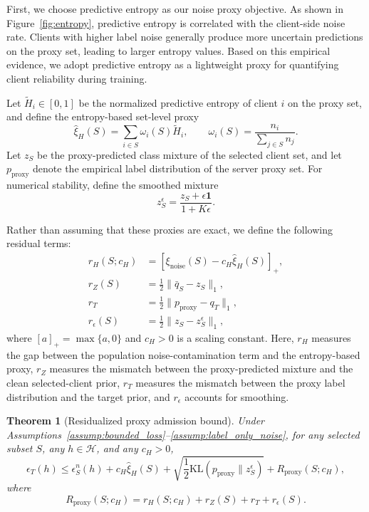 \documentclass[conference]{IEEEtran}
\newtheorem{theorem}{Theorem}
\theoremstyle{definition}
\theoremstyle{remark}
\begin{document}
First, we choose predictive entropy as our noise proxy objective. As shown in Figure~\ref{fig:entropy}, predictive entropy is correlated with the client-side noise rate. Clients with higher label noise generally produce more uncertain predictions on the proxy set, leading to larger entropy values. Based on this empirical evidence, we adopt predictive entropy as a lightweight proxy for quantifying client reliability during training.

Let $\widetilde H_i\in[0,1]$ be the normalized predictive entropy of client $i$ on the proxy set, and define the entropy-based set-level proxy
\begin{equation}
\label{eq:entropy_proxy_set}
\widehat{\xi}_{H}(S)
=
\sum_{i\in S}
\omega_i(S)\widetilde H_i,
\qquad
\omega_i(S)=\frac{n_i}{\sum_{j\in S}n_j}.
\end{equation}
Let $z_S$ be the proxy-predicted class mixture of the selected client set, and let $p_{\mathrm{proxy}}$ denote the empirical label distribution of the server proxy set.
For numerical stability, define the smoothed mixture
\begin{equation}
\label{eq:smoothed_proxy_mixture}
z_S^\epsilon
=
\frac{z_S+\epsilon \mathbf 1}{1+K\epsilon}.
\end{equation}

Rather than assuming that these proxies are exact, we define the following residual terms:
\begin{align}
\label{eq:entropy_residual}
r_H(S;c_H)
&=
\left[
\xi_{\mathrm{noise}}(S)
-
c_H\widehat{\xi}_{H}(S)
\right]_+,\\
\label{eq:coverage_residual}
r_Z(S)
&=
\frac12\|\bar q_S-z_S\|_1,\\
\label{eq:target_proxy_residual}
r_T
&=
\frac12\|p_{\mathrm{proxy}}-q_T\|_1,\\
\label{eq:smoothing_residual}
r_\epsilon(S)
&=
\frac12\|z_S-z_S^\epsilon\|_1,
\end{align}
where $[a]_+=\max\{a,0\}$ and $c_H>0$ is a scaling constant.
Here, $r_H$ measures the gap between the population noise-contamination term and the entropy-based proxy, $r_Z$ measures the mismatch between the proxy-predicted mixture and the clean selected-client prior, $r_T$ measures the mismatch between the proxy label distribution and the target prior, and $r_\epsilon$ accounts for smoothing.

\begin{theorem}[Residualized proxy admission bound]
\label{thm:residualized_proxy_bound}
Under Assumptions~\ref{assump:bounded_loss}--\ref{assump:label_only_noise}, for any selected subset $S$, any $h\in\mathcal H$, and any $c_H>0$,
\begin{equation}
\label{eq:residualized_proxy_bound}
\epsilon_T(h)
\le
\epsilon_S^n(h)
+
c_H\widehat{\xi}_{H}(S)
+
\sqrt{
\frac12
\mathrm{KL}
\left(
p_{\mathrm{proxy}}\|z_S^\epsilon
\right)
}
+
R_{\mathrm{proxy}}(S;c_H),
\end{equation}
where
\begin{equation}
\label{eq:proxy_residual_total}
R_{\mathrm{proxy}}(S;c_H)
=
r_H(S;c_H)
+
r_Z(S)
+
r_T
+
r_\epsilon(S).
\end{equation}
\end{theorem}
\end{document}
